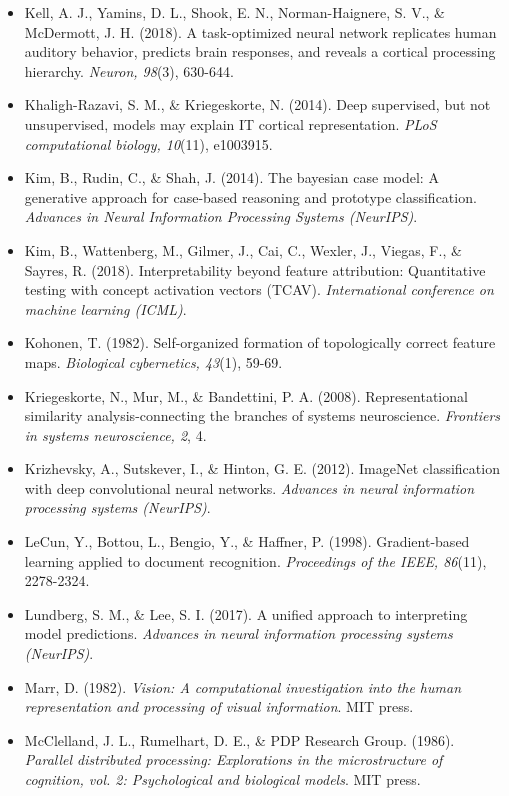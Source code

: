 \documentclass[11pt,a4paper]{article}
\begin{document}
\begin{itemize}
    \item Kell, A. J., Yamins, D. L., Shook, E. N., Norman-Haignere, S. V., \& McDermott, J. H. (2018). A task-optimized neural network replicates human auditory behavior, predicts brain responses, and reveals a cortical processing hierarchy. \textit{Neuron, 98}(3), 630-644.
    \item Khaligh-Razavi, S. M., \& Kriegeskorte, N. (2014). Deep supervised, but not unsupervised, models may explain IT cortical representation. \textit{PLoS computational biology, 10}(11), e1003915.
    \item Kim, B., Rudin, C., \& Shah, J. (2014). The bayesian case model: A generative approach for case-based reasoning and prototype classification. \textit{Advances in Neural Information Processing Systems (NeurIPS)}.
    \item Kim, B., Wattenberg, M., Gilmer, J., Cai, C., Wexler, J., Viegas, F., \& Sayres, R. (2018). Interpretability beyond feature attribution: Quantitative testing with concept activation vectors (TCAV). \textit{International conference on machine learning (ICML)}.
    \item Kohonen, T. (1982). Self-organized formation of topologically correct feature maps. \textit{Biological cybernetics, 43}(1), 59-69.
    \item Kriegeskorte, N., Mur, M., \& Bandettini, P. A. (2008). Representational similarity analysis-connecting the branches of systems neuroscience. \textit{Frontiers in systems neuroscience, 2}, 4.
    \item Krizhevsky, A., Sutskever, I., \& Hinton, G. E. (2012). ImageNet classification with deep convolutional neural networks. \textit{Advances in neural information processing systems (NeurIPS)}.
    \item LeCun, Y., Bottou, L., Bengio, Y., \& Haffner, P. (1998). Gradient-based learning applied to document recognition. \textit{Proceedings of the IEEE, 86}(11), 2278-2324.
    \item Lundberg, S. M., \& Lee, S. I. (2017). A unified approach to interpreting model predictions. \textit{Advances in neural information processing systems (NeurIPS)}.
    \item Marr, D. (1982). \textit{Vision: A computational investigation into the human representation and processing of visual information}. MIT press.
    \item McClelland, J. L., Rumelhart, D. E., \& PDP Research Group. (1986). \textit{Parallel distributed processing: Explorations in the microstructure of cognition, vol. 2: Psychological and biological models}. MIT press.

\end{itemize}
\end{document}

